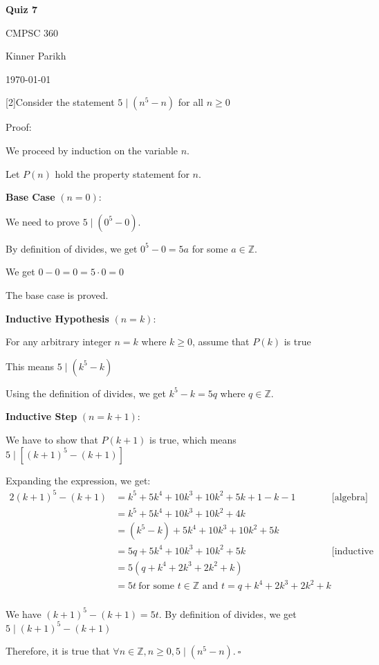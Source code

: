 \documentclass{article} %
\newcommand{\question}[2][]{\begin{flushleft}
        \textbf{Question #1}: #2

\end{flushleft}}
\newcommand{\maketitletwo}[2][]{\begin{center}
        \Large{\textbf{Quiz #1}
            
            CMPSC 360} %
        \vspace{5pt}
        
        \normalsize{Kinner Parikh  %
        
        \today}        %
        \vspace{15pt}
        
\end{center}}
\begin{document}
    \maketitletwo[7]  %
    
    \question[2]{Consider the statement $5 \mid (n^5 - n)$ for all $n \geq 0$}

    Proof:

    We proceed by induction on the variable $n$.

    Let $P(n)$ hold the property statement for $n$.

    \textbf{Base Case} $(n = 0)$:

    We need to prove $5 \mid (0^5 - 0)$.

    By definition of divides, we get $0^5 - 0 = 5a$ for some $a \in \mathbb{Z}$.

    We get $0 - 0 = 0 = 5 \cdot 0 = 0$

    The base case is proved.

    \textbf{Inductive Hypothesis} $(n = k)$:

    For any arbitrary integer $n = k$ where $k \geq 0$, assume that $P(k)$ is true

    This means $5 \mid (k^5 - k)$

    Using the definition of divides, we get $k^5 - k = 5q$ where $q \in \mathbb{Z}$.

    \textbf{Inductive Step} $(n = k + 1)$:

    We have to show that $P(k + 1)$ is true, which means $5 \mid [(k + 1)^5 - (k + 1)]$

    Expanding the expression, we get:
    \begin{alignat*}{2}
        (k + 1)^5 - (k + 1) &= k^5+5k^4+10k^3+10k^2+5k+1 - k - 1\ &&\text{[algebra]}\\        
        &= k^5+5k^4+10k^3+10k^2+4k\\
        &= (k^5 - k) +5k^4+10k^3+10k^2+5k\\
        &= 5q+5k^4+10k^3+10k^2+5k &&\text{[inductive step]}\\
        &= 5(q + k^4 + 2k^3 + 2k^2 + k)\\
        &= 5t\ \text{for some $t \in \mathbb{Z}$ and $t = q + k^4 + 2k^3 + 2k^2 + k$}\\
    \end{alignat*}

    We have $(k + 1)^5 - (k + 1) = 5t$. By definition of divides, we get $5 \mid (k + 1)^5 - (k + 1)$
    
    Therefore, it is true that $\forall n \in \mathbb{Z}, n \geq 0, 5 \mid (n^5 - n).\ \square$
    
\end{document}
